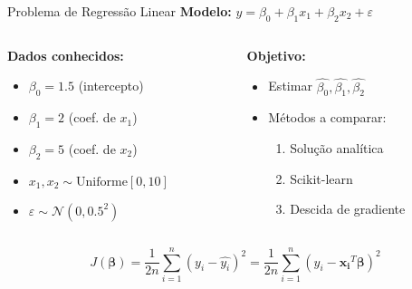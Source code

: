 \documentclass[xcolor=dvipsnames,t,aspectratio=169]{beamer} %
\begin{document}
\begin{frame}[c]{Problema de Regressão Linear}
    \textbf{Modelo:} $y = \beta_0 + \beta_1 x_1 + \beta_2 x_2 + \varepsilon$
    \vspace{.2cm}
    \begin{columns}[c]
        \begin{column}{0.5\textwidth}
            \textbf{Dados conhecidos:}
            \begin{itemize}
                \item $\beta_0 = 1.5$ (intercepto)
                \item $\beta_1 = 2$ (coef. de $x_1$)
                \item $\beta_2 = 5$ (coef. de $x_2$)
                \item $x_1, x_2 \sim \text{Uniforme}[0,10]$
                \item $\varepsilon \sim \mathcal{N}(0, 0.5^2)$
            \end{itemize}
        \end{column}
        \begin{column}{0.5\textwidth}
            \textbf{Objetivo:}
            \begin{itemize}
                \item Estimar $\hat{\beta_0}, \hat{\beta_1}, \hat{\beta_2}$
                \item Métodos a comparar:
                \begin{enumerate}
                    \item Solução analítica
                    \item Scikit-learn
                    \item Descida de gradiente
                \end{enumerate}
            \end{itemize}
        \end{column}
    \end{columns}
    
    \vspace{0.5cm}
    \begin{display}
        \begin{equation}
            J(\boldsymbol{\beta}) = \frac{1}{2n}\sum_{i=1}^{n}(y_i - \hat{y_i})^2 = \frac{1}{2n}\sum_{i=1}^{n}(y_i - \boldsymbol{x_i}^T\boldsymbol{\beta})^2
        \end{equation}
    \end{display}
\end{frame}
\end{document}
